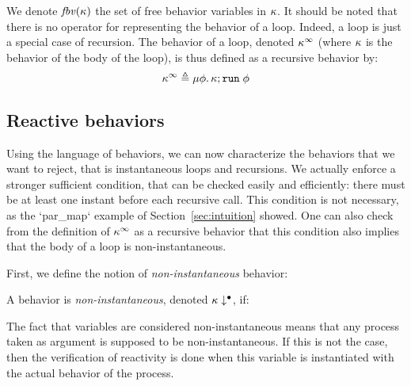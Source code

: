 \documentclass[9pt,preprint]{sigplanconf}
\newcommand{\deq}{\triangleq}
\begin{document}
We denote $\mathit{fbv}(\kappa)$ the set of free behavior variables in $\kappa$. It should be noted that there is no operator for representing the behavior of a loop. Indeed, a loop is just a special case of recursion. The behavior of a loop, denoted $\kappa^\infty$ (where $\kappa$ is the behavior of the body of the loop), is thus defined as a recursive behavior by:
\[\effinf{\rk} \deq \effrec{\effvar}{\effcon{\rk}{\effrun{\effvar}}} \]

%
%
%
%
%


\subsection{Reactive behaviors}
\label{sec:reactive_behavior}

Using the language of behaviors, we can now characterize the behaviors that we want to reject, that is instantaneous loops and recursions. We actually enforce a stronger sufficient condition, that can be checked easily and efficiently: there must be at least one instant before each recursive call. This condition is not necessary, as the `par_map` example of Section~\ref{sec:intuition} showed. One can also check from the definition of $\kappa^\infty$ as a recursive behavior that this condition also implies that the body of a loop is non-instantaneous.

First, we define the notion of \emph{non-instantaneous} behavior:
\begin{definition}
A behavior is \emph{non-instantaneous}, denoted $\kappa\downarrow^{\bullet}$, if:

\end{definition}
The fact that variables are considered non-instantaneous means that any process taken as argument is supposed to be non-instantan\-eous. If this is not the case, then the verification of reactivity is done when this variable is instantiated with the actual behavior of the process.
\end{document}
